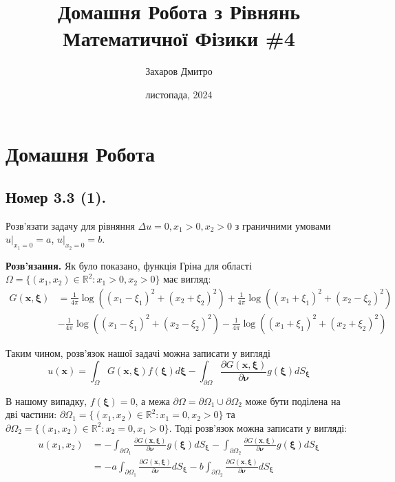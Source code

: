 \documentclass{hw_template}
\title{\huge\sffamily\bfseries Домашня Робота з Рівнянь Математичної Фізики \#4}
\author{\Large\sffamily Захаров Дмитро}
\date{\sffamily 9 листопада, 2024}
\begin{document}
\pagestyle{fancy}

\maketitle

\tableofcontents

\pagebreak

\section{Домашня Робота}

\subsection{Номер 3.3 (1).}

\begin{problem}
    Розв'язати задачу для рівняння $\Delta u = 0, x_1 > 0, x_2 > 0$ з граничними
    умовами $u\Big|_{x_1=0} = a$, $u\Big|_{x_2 = 0} = b$.
\end{problem}

\textbf{Розв'язання.} Як було показано, функція Гріна для області $\Omega = \{(x_1,x_2) \in \mathbb{R}^2: x_1 > 0, x_2 > 0\}$ має вигляд:
\begin{align*}
    G(\mathbf{x},\boldsymbol{\xi}) &= \frac{1}{4\pi}\log ((x_1-\xi_1)^2+(x_2+\xi_2)^2) + \frac{1}{4\pi}\log((x_1+\xi_1)^2+(x_2-\xi_2)^2) \\
    & -\frac{1}{4\pi}\log ((x_1-\xi_1)^2 + (x_2-\xi_2)^2) - \frac{1}{4\pi}\log((x_1+\xi_1)^2+(x_2+\xi_2)^2)
\end{align*}

Таким чином, розв'язок нашої задачі можна записати у вигляді
\begin{equation*}
    u(\mathbf{x}) = \int_{\Omega} G(\mathbf{x},\boldsymbol{\xi})f(\boldsymbol{\xi})d\boldsymbol{\xi} - \int_{\partial\Omega} \frac{\partial G(\mathbf{x},\boldsymbol{\xi})}{\partial \boldsymbol{\nu}}g(\boldsymbol{\xi})dS_{\boldsymbol{\xi}}
\end{equation*}

В нашому випадку, $f(\boldsymbol{\xi}) = 0$, а межа $\partial\Omega = \partial\Omega_1 \cup \partial\Omega_2$ може бути поділена на дві
частини: $\partial \Omega_1 = \{ (x_1,x_2) \in \mathbb{R}^2: x_1 = 0, x_2 > 0\}$
та $\partial \Omega_2 = \{ (x_1,x_2) \in \mathbb{R}^2: x_2 = 0, x_1 > 0\}$. Тоді
розв'язок можна записати у вигляді:
\begin{align*}
    u(x_1,x_2) &= -\int_{\partial \Omega_1} \frac{\partial G(\mathbf{x},\boldsymbol{\xi})}{\partial \boldsymbol{\nu}}g(\boldsymbol{\xi})dS_{\boldsymbol{\xi}} -\int_{\partial \Omega_2} \frac{\partial G(\mathbf{x},\boldsymbol{\xi})}{\partial \boldsymbol{\nu}}g(\boldsymbol{\xi})dS_{\boldsymbol{\xi}} \\
    &= -a\int_{\partial \Omega_1} \frac{\partial G(\mathbf{x},\boldsymbol{\xi})}{\partial \boldsymbol{\nu}}dS_{\boldsymbol{\xi}} - b\int_{\partial \Omega_2} \frac{\partial G(\mathbf{x},\boldsymbol{\xi})}{\partial \boldsymbol{\nu}}dS_{\boldsymbol{\xi}}
\end{align*}
\end{document}
